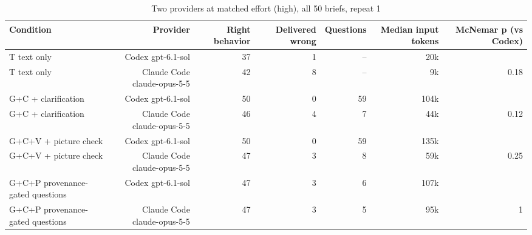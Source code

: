 \begin{table}[t]
\centering\small
\caption{Two providers at matched effort (high), all 50 briefs, repeat 1}
\label{tab:t7_providers}
\begin{tabular}{lrrrrrr}
\toprule
Condition & Provider & Right behavior & Delivered wrong & Questions & Median input tokens & McNemar p (vs Codex) \\
\midrule
T text only & Codex gpt-6.1-sol & 37 & 1 & -- & 20k &  \\
T text only & Claude Code claude-opus-5-5 & 42 & 8 & -- & 9k & 0.18 \\
G+C + clarification & Codex gpt-6.1-sol & 50 & 0 & 59 & 104k &  \\
G+C + clarification & Claude Code claude-opus-5-5 & 46 & 4 & 7 & 44k & 0.12 \\
G+C+V + picture check & Codex gpt-6.1-sol & 50 & 0 & 59 & 135k &  \\
G+C+V + picture check & Claude Code claude-opus-5-5 & 47 & 3 & 8 & 59k & 0.25 \\
G+C+P provenance-gated questions & Codex gpt-6.1-sol & 47 & 3 & 6 & 107k &  \\
G+C+P provenance-gated questions & Claude Code claude-opus-5-5 & 47 & 3 & 5 & 95k & 1 \\
\bottomrule
\end{tabular}
\end{table}
